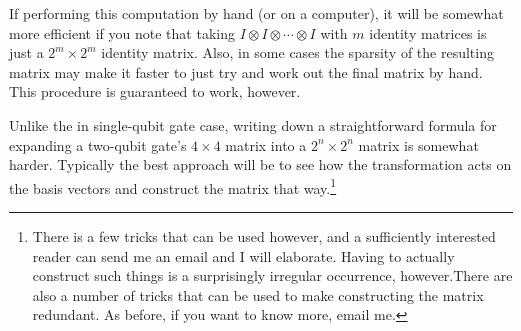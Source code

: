 \documentclass[11pt]{article}
\begin{document}
\begin{remark}
	If performing this computation by hand (or on a computer), it will be somewhat more efficient if you note that taking $I \otimes  I \otimes  \cdots  \otimes I$ with $m$ identity matrices is just a $2^m \times 2^m$ identity matrix. Also, in some cases the sparsity of the resulting matrix may make it faster to just try and work out the final matrix by hand. This procedure is guaranteed to work, however.
\end{remark}

Unlike the in single-qubit gate case, writing down a straightforward formula for expanding a two-qubit gate's $4 \times 4$ matrix into a $2^n \times 2^n$ matrix is somewhat harder. Typically the best approach will be to see how the transformation acts on the basis vectors and construct the matrix that way.\footnote{There is a few tricks that can be used however, and a sufficiently interested reader can send me an email and I will elaborate. Having to actually construct such things is a surprisingly irregular occurrence, however.There are also a number of tricks that can be used to make constructing the matrix redundant. As before, if you want to know more, email me.}
\end{document}
